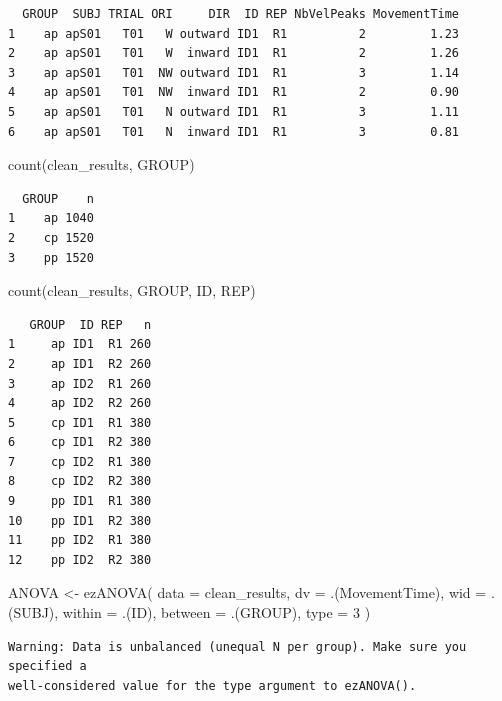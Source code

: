 \documentclass[
  letterpaper,
  DIV=11,
  numbers=noendperiod]{scrartcl}
\newenvironment{Shaded}{\begin{snugshade}}{\end{snugshade}}
\newcommand{\AttributeTok}[1]{\textcolor[rgb]{0.40,0.45,0.13}{#1}}
\newcommand{\DecValTok}[1]{\textcolor[rgb]{0.68,0.00,0.00}{#1}}
\newcommand{\FunctionTok}[1]{\textcolor[rgb]{0.28,0.35,0.67}{#1}}
\newcommand{\NormalTok}[1]{\textcolor[rgb]{0.00,0.23,0.31}{#1}}
\newcommand{\OtherTok}[1]{\textcolor[rgb]{0.00,0.23,0.31}{#1}}
\begin{document}
\begin{verbatim}
  GROUP  SUBJ TRIAL ORI     DIR  ID REP NbVelPeaks MovementTime
1    ap apS01   T01   W outward ID1  R1          2         1.23
2    ap apS01   T01   W  inward ID1  R1          2         1.26
3    ap apS01   T01  NW outward ID1  R1          3         1.14
4    ap apS01   T01  NW  inward ID1  R1          2         0.90
5    ap apS01   T01   N outward ID1  R1          3         1.11
6    ap apS01   T01   N  inward ID1  R1          3         0.81
\end{verbatim}

\begin{Shaded}
\begin{Highlighting}[]
\FunctionTok{count}\NormalTok{(clean\_results, GROUP)}
\end{Highlighting}
\end{Shaded}

\begin{verbatim}
  GROUP    n
1    ap 1040
2    cp 1520
3    pp 1520
\end{verbatim}

\begin{Shaded}
\begin{Highlighting}[]
\FunctionTok{count}\NormalTok{(clean\_results, GROUP, ID, REP)}
\end{Highlighting}
\end{Shaded}

\begin{verbatim}
   GROUP  ID REP   n
1     ap ID1  R1 260
2     ap ID1  R2 260
3     ap ID2  R1 260
4     ap ID2  R2 260
5     cp ID1  R1 380
6     cp ID1  R2 380
7     cp ID2  R1 380
8     cp ID2  R2 380
9     pp ID1  R1 380
10    pp ID1  R2 380
11    pp ID2  R1 380
12    pp ID2  R2 380
\end{verbatim}

\begin{Shaded}
\begin{Highlighting}[]
\NormalTok{ANOVA }\OtherTok{\textless{}{-}} \FunctionTok{ezANOVA}\NormalTok{(}
  \AttributeTok{data =}\NormalTok{ clean\_results,}
  \AttributeTok{dv =}\NormalTok{ .(MovementTime),}
  \AttributeTok{wid =}\NormalTok{ .(SUBJ),}
  \AttributeTok{within =}\NormalTok{ .(ID),}
  \AttributeTok{between =}\NormalTok{ .(GROUP),}
  \AttributeTok{type =} \DecValTok{3}
\NormalTok{)}
\end{Highlighting}
\end{Shaded}

\begin{verbatim}
Warning: Data is unbalanced (unequal N per group). Make sure you specified a
well-considered value for the type argument to ezANOVA().
\end{verbatim}
\end{document}
